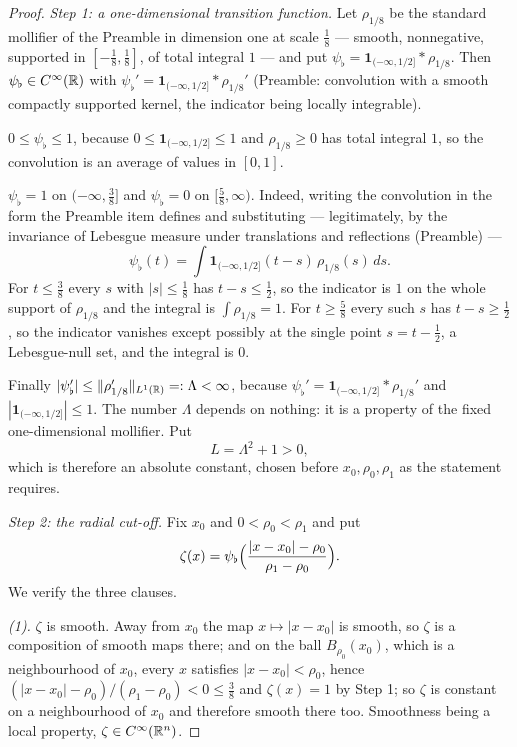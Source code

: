 \begin{proof}
\emph{Step 1: a one-dimensional transition function.}  Let $\rho_{1/8}$ be the
standard mollifier of the Preamble in dimension one at scale $\tfrac18$ ---
smooth, nonnegative, supported in $[-\tfrac18,\tfrac18]$, of total integral $1$
--- and put $\psi_\flat=\mathbf1_{(-\infty,1/2]}*\rho_{1/8}$.  Then
$\psi_\flat\in C^\infty(\mathbb{R})$ with
$\psi_\flat'=\mathbf1_{(-\infty,1/2]}*\rho_{1/8}'$ (Preamble: convolution with a
smooth compactly supported kernel, the indicator being locally integrable).

$0\le\psi_\flat\le1$, because $0\le\mathbf1_{(-\infty,1/2]}\le1$ and
$\rho_{1/8}\ge0$ has total integral $1$, so the convolution is an average of
values in $[0,1]$.

$\psi_\flat=1$ on $(-\infty,\tfrac38]$ and $\psi_\flat=0$ on $[\tfrac58,\infty)$.
Indeed, writing the convolution in the form the Preamble item defines and
substituting --- legitimately, by the invariance of Lebesgue measure under
translations and reflections (Preamble) ---
\[
\psi_\flat(t)=\int\mathbf1_{(-\infty,1/2]}(t-s)\,\rho_{1/8}(s)\,ds .
\]
For $t\le\tfrac38$ every $s$ with $|s|\le\tfrac18$ has $t-s\le\tfrac12$, so the
indicator is $1$ on the whole support of $\rho_{1/8}$ and the integral is
$\int\rho_{1/8}=1$.  For $t\ge\tfrac58$ every such $s$ has $t-s\ge\tfrac12$, so
the indicator vanishes except possibly at the single point $s=t-\tfrac12$, a
Lebesgue-null set, and the integral is $0$.

Finally $|\psi_\flat'|\le\|\rho_{1/8}'\|_{L^1(\mathbb{R})}=:\Lambda<\infty$, because
$\psi_\flat'=\mathbf1_{(-\infty,1/2]}*\rho_{1/8}'$ and
$|\mathbf1_{(-\infty,1/2]}|\le1$.  The number $\Lambda$ depends on nothing: it
is a property of the fixed one-dimensional mollifier.  Put
\[
L=\Lambda^2+1>0 ,
\]
which is therefore an absolute constant, chosen before $x_0,\rho_0,\rho_1$ as
the statement requires.

\emph{Step 2: the radial cut-off.}  Fix $x_0$ and $0<\rho_0<\rho_1$ and put
\[
\zeta(x)=\psi_\flat\Bigl(\frac{|x-x_0|-\rho_0}{\rho_1-\rho_0}\Bigr).
\]
We verify the three clauses.

\emph{(1).}  $\zeta$ is smooth.  Away from $x_0$ the map $x\mapsto|x-x_0|$ is
smooth, so $\zeta$ is a composition of smooth maps there; and on the ball
$B_{\rho_0}(x_0)$, which is a neighbourhood of $x_0$, every $x$ satisfies
$|x-x_0|<\rho_0$, hence $(|x-x_0|-\rho_0)/(\rho_1-\rho_0)<0\le\tfrac38$ and
$\zeta(x)=1$ by Step 1; so $\zeta$ is constant on a neighbourhood of $x_0$ and
therefore smooth there too.  Smoothness being a local property, $\zeta\in
C^\infty(\mathbb{R}^n)$.


\end{proof}
